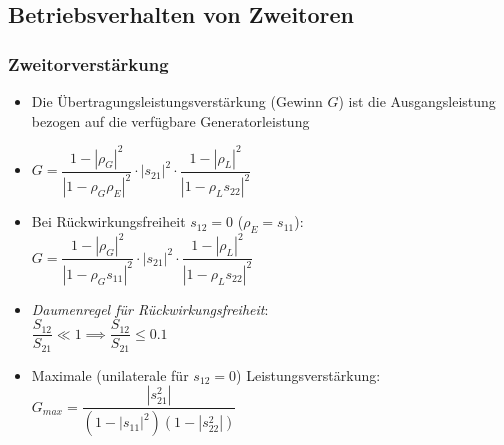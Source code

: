 {\subsection{Betriebsverhalten von Zweitoren}
\subsubsection{Zweitorverstärkung}
\begin{itemize}
    \itemsep2pt
    \item Die Übertragungsleistungsverstärkung (Gewinn $G$) ist die Ausgangsleistung bezogen auf die verfügbare Generatorleistung
    \item \(G = \dfrac{1 - |\rho_G|^2}{|1 - \rho_G \rho_E|^2} \cdot |s_{21}|^2 \cdot \dfrac{1 - |\rho_L|^2}{|1 - \rho_{L}s_{22}|^2}\)
    \item Bei Rückwirkungsfreiheit $s_{12} = 0$ ($\rho_E = s_{11}$):\\
        \(G = \dfrac{1 - |\rho_G|^2}{|1 - \rho_G s_{11}|^2} \cdot |s_{21}|^2 \cdot \dfrac{1 - |\rho_L|^2}{|1 - \rho_{L}s_{22}|^2}\)
    \item \textit{Daumenregel für Rückwirkungsfreiheit}:\\
        \(\dfrac{S_{12}}{S_{21}} \ll 1 \implies \dfrac{S_{12}}{S_{21}} \leq 0.1\)
    \item Maximale (unilaterale für $s_{12} = 0$) Leistungsverstärkung:\\
        \(G_{max} = \dfrac{|s_{21}^2|}{(1 - |s_{11}|^2) (1 - |s_{22}^2|)}\)
\end{itemize}
}
